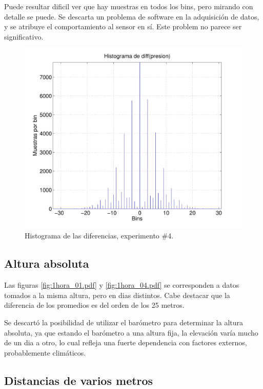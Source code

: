 \documentclass[spanish,12pt,a4paper,titlepage]{report}
\begin{document}
Puede resultar dificil ver que hay muestras en todos los bins, pero mirando con detalle se puede. Se descarta un problema de software en la adquisición de datos, y se atribuye el comportamiento al sensor en sí. Este problem no parece ser significativo.
\vspace{-15pt}
\begin{figure}[h!]
\centering
  \includegraphics[width=.75\textwidth]{./pics/barom_hist_exp4.pdf}
\vspace{-15pt}
  \caption{Histograma de las diferencias, experimento \#4.}
  \label{fig:barom_hist_exp4.pdf}
\end{figure}
\vspace{-40pt}


\newpage
\subsection{Altura absoluta}

Las figuras \ref{fig:1hora_01.pdf} y \ref{fig:1hora_04.pdf} se corresponden a datos tomados a la misma altura, pero en dias distintos. Cabe destacar que la diferencia de los promedios es del orden de los 25 metros.

Se descartó la posibilidad de utilizar el barómetro para determinar la altura absoluta, ya que estando el barómetro a una altura fija, la elevación varía mucho de un dia a otro, lo cual refleja una fuerte dependencia con factores externos, probablemente climáticos.

\subsection{Distancias de varios metros}
\end{document}
